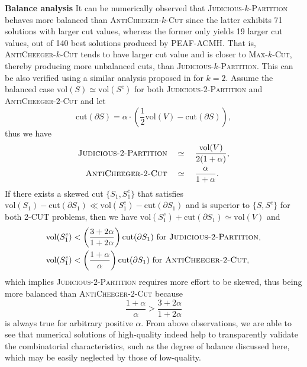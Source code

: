 \documentclass[12pt, a4paper]{article}%
\newcommand{\cut}{\mathrm{cut}}
\newcommand{\vol}{\mathrm{vol}}
\numberwithin{equation}{section}
\theoremstyle{plain}
\begin{document}
				\textbf{Balance analysis} 
				It can be numerically observed that 
				\textsc{Judicious}-$k$-\textsc{Partition} behaves more balanced than \textsc{AntiCheeger}-$k$-\textsc{Cut}
				since the latter exhibits 71 solutions with larger cut values, whereas the former only yields 19 larger cut values,
				out of 140 best solutions produced by PEAF-ACMH. That is, \textsc{AntiCheeger}-$k$-\textsc{Cut} tends to have larger cut value and is closer to \textsc{Max}-$k$-\textsc{Cut}, thereby producing more unbalanced cuts, than \textsc{Judicious}-$k$-\textsc{Partition}.
				This can be also verified using a similar analysis proposed in \cite{ding2001min} for $k=2$. 
				Assume the balanced case $\vol(S)\simeq \vol(S^c)$ for both \textsc{Judicious}-$2$-\textsc{Partition} and \textsc{AntiCheeger}-$2$-\textsc{Cut} and let
				$$\cut(\partial S)=\alpha\cdot\left(\frac{1}{2}\vol(V)-\cut(\partial S)\right),$$
				thus we have
				\begin{align*}
					\textsc{Judicious-}2 \textsc{-Partition}\quad&\simeq\quad \frac{\vol(V)}{2(1+\alpha)}, \\
					\textsc{AntiCheeger-}2 \textsc{-Cut}\quad&\simeq\quad \frac{\alpha}{1+\alpha}.
				\end{align*}
				If there exists a skewed cut $\{S_1,S_1^c\}$ that satisfies $\vol(S_1)-\cut(\partial S_1)\ll \vol(S_1^c)-\cut(\partial S_1)$ and is superior to $\{S,S^c\}$ for both 2-CUT problems, then we have $\vol(S_1^c)+\cut(\partial S_1)\simeq \vol(V)$  and
				\begin{align*}
					\vol(S_1^c)&<\left(\frac{3+2\alpha}{1+2\alpha}\right)\cut(\partial S_1) \text{ for }\textsc{Judicious-}2 \textsc{-Partition}, \\
					\vol(S_1^c)&<\left(\frac{1+\alpha}{\alpha}\right)\cut(\partial S_1) \text{ for }\textsc{AntiCheeger-}2 \textsc{-Cut}, \\
				\end{align*}
				which implies \textsc{Judicious}-$2$-\textsc{Partition} requires more effort to be skewed, thus being more balanced than \textsc{AntiCheeger}-$2$-\textsc{Cut} because 	 
				$$
				\frac{1+\alpha}{\alpha}  > \frac{3+2\alpha}{1+2\alpha}
				$$
				is always true for arbitrary positive $\alpha$. %
				From above observations, we are able to see that numerical solutions of high-quality indeed help to transparently validate the combinatorial characteristics, such as the degree of balance discussed here, which may be easily neglected by those of low-quality.
				
				
				
\end{document}
